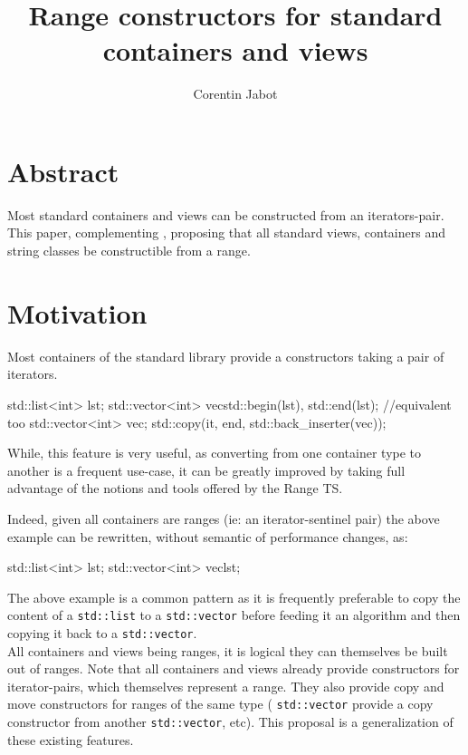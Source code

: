 \documentclass{wg21}
\title{Range constructors for standard containers and views}
\author{Corentin Jabot}{corentin.jabot@gmail.com}
\newcommand{\cc}[1]{\texttt{#1}}
\begin{document}
\maketitle

\section{Abstract}
Most standard containers and views can be constructed from an iterators-pair.
This paper, complementing \cite{P0896R3}, proposing that all standard views,
containers and string classes be constructible from a range.


\section{Motivation}

Most containers of the standard library provide a constructors taking a pair of iterators.

\begin{codeblock}
    std::list<int> lst;
    std::vector<int> vec{std::begin(lst), std::end(lst)};
    //equivalent too
    std::vector<int> vec;
    std::copy(it, end, std::back_inserter(vec));
\end{codeblock}

While, this feature is very useful, as converting from one container type to another is a frequent
use-case, it can be greatly improved by taking full advantage of the notions and tools offered by the Range TS.

Indeed, given all containers are ranges (ie: an iterator-sentinel pair) the above example can be rewritten, without semantic of performance changes, as:

\begin{codeblock}
    std::list<int> lst;
    std::vector<int> vec{lst};
\end{codeblock}


The above example is a common pattern as it is frequently preferable to copy the content of a \cc{std::list} to
a \cc{std::vector} before feeding it an algorithm and then copying it back to a \cc{std::vector}.\\

All containers and views being ranges, it is logical they can themselves be built out of ranges.
Note that all containers and views already provide constructors for iterator-pairs, which themselves represent a range.
They also provide copy and move constructors for ranges of the same type ( \cc{std::vector} provide a copy constructor from another \cc{std::vector}, etc).
This proposal is a generalization of these existing features.
\end{document}
